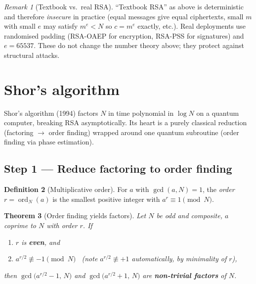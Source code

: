 \documentclass[11pt]{article}
\theoremstyle{plain}
\newtheorem{theorem}{Theorem}[section]
\theoremstyle{definition}
\newtheorem{definition}[theorem]{Definition}
\theoremstyle{remark}
\newtheorem{remark}[theorem]{Remark}
\DeclareMathOperator{\ord}{ord}
\begin{document}
\begin{remark}[Textbook vs.\ real RSA]
``Textbook RSA'' as above is deterministic and therefore \emph{insecure} in practice
(equal messages give equal ciphertexts, small $m$ with small $e$ may satisfy $m^e<N$ so
$c=m^e$ exactly, etc.). Real deployments use randomised padding (RSA-OAEP for
encryption, RSA-PSS for signatures) and $e=65537$. These do not change the number
theory above; they protect against structural attacks.
\end{remark}

\section{Shor's algorithm}

Shor's algorithm (1994) factors $N$ in time polynomial in $\log N$ on a quantum
computer, breaking RSA asymptotically. Its heart is a purely classical reduction
(factoring $\to$ order finding) wrapped around one quantum subroutine (order finding
via phase estimation).

\subsection{Step 1 --- Reduce factoring to order finding}

\begin{definition}[Multiplicative order]
For $a$ with $\gcd(a,N)=1$, the \emph{order} $r=\ord_N(a)$ is the smallest positive
integer with $a^{r}\equiv 1 \pmod N$.
\end{definition}

\begin{theorem}[Order finding yields factors]\label{thm:order-factor}
Let $N$ be odd and composite, $a$ coprime to $N$ with order $r$. If
\begin{enumerate}[label=(\roman*),leftmargin=2.4em,itemsep=0pt,topsep=2pt]
  \item $r$ is \textbf{even}, and
  \item $a^{r/2}\not\equiv -1 \pmod N$ \ (note $a^{r/2}\not\equiv +1$ automatically, by
        minimality of $r$),
\end{enumerate}
then $\gcd\!\big(a^{r/2}-1,\,N\big)$ and $\gcd\!\big(a^{r/2}+1,\,N\big)$ are
\textbf{non-trivial factors} of $N$.
\end{theorem}
\end{document}
